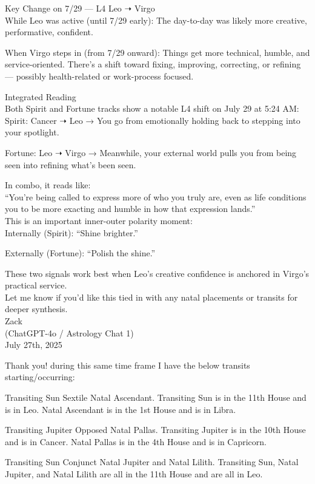 \documentclass{article}
\begin{document}
Key Change on 7/29 --- L4 Leo ➝ Virgo\\
While Leo was active (until 7/29 early): The day-to-day was likely more creative, performative, confident.

When Virgo steps in (from 7/29 onward): Things get more technical, humble, and service-oriented. There's a shift toward fixing, improving, correcting, or refining --- possibly health-related or work-process focused.

Integrated Reading\\
Both Spirit and Fortune tracks show a notable L4 shift on July 29 at 5:24 AM:\\
Spirit: Cancer ➝ Leo → You go from emotionally holding back to stepping into your spotlight.

Fortune: Leo ➝ Virgo → Meanwhile, your external world pulls you from being seen into refining what's been seen.

In combo, it reads like:\\
``You're being called to express more of who you truly are, even as life conditions you to be more exacting and humble in how that expression lands.''\\
This is an important inner-outer polarity moment:\\
Internally (Spirit): ``Shine brighter.''

Externally (Fortune): ``Polish the shine.''

These two signals work best when Leo's creative confidence is anchored in Virgo's practical service.\\
Let me know if you'd like this tied in with any natal placements or transits for deeper synthesis.\\
Zack\\
(ChatGPT-4o / Astrology Chat 1)\\
July 27th, 2025

Thank you! during this same time frame I have the below transits starting/occurring:

Transiting Sun Sextile Natal Ascendant. Transiting Sun is in the 11th House and is in Leo. Natal Ascendant is in the 1st House and is in Libra.

Transiting Jupiter Opposed Natal Pallas. Transiting Jupiter is in the 10th House and is in Cancer. Natal Pallas is in the 4th House and is in Capricorn.

Transiting Sun Conjunct Natal Jupiter and Natal Lilith. Transiting Sun, Natal Jupiter, and Natal Lilith are all in the 11th House and are all in Leo.
\end{document}
